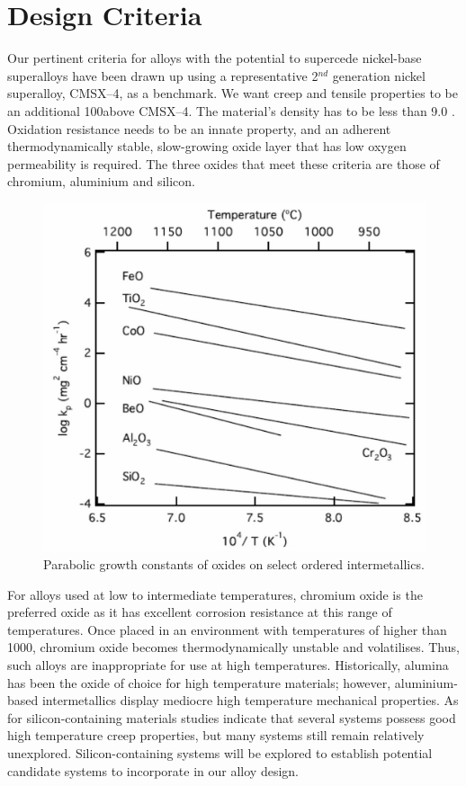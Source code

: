 
\section{Design Criteria}

Our pertinent criteria for alloys with the potential to supercede nickel-base superalloys have been drawn up using a representative 2$^{nd}$ generation nickel superalloy, CMSX--4, as a benchmark. We want creep and tensile properties to be an additional 100\celsius above CMSX--4. The material's density has to be less than 9.0 \gram\usk\centi\rpcubic\metre. Oxidation resistance needs to be an innate property, and an adherent thermodynamically stable, slow-growing oxide layer that has low oxygen permeability is required.  The three oxides that meet these criteria are those of chromium, aluminium and silicon.
%
\begin{figure}[H]
\begin{center}
\includegraphics{IntermetallicOxidation}
\caption{Parabolic growth constants of oxides on select ordered intermetallics.}
\label{fig:IntermetallicOxidation}
\end{center}
\end{figure}
%
For alloys used at low to intermediate temperatures, chromium oxide is the preferred oxide as it has excellent corrosion resistance at this range of temperatures. Once placed in an environment with temperatures of higher than 1000\celsius , chromium oxide becomes thermodynamically unstable and volatilises. Thus, such alloys are inappropriate for use at high temperatures. Historically, alumina has been the oxide of choice for high temperature materials; however, aluminium-based intermetallics display mediocre high temperature mechanical properties. As for silicon-containing materials studies indicate that several systems possess good high temperature creep properties, but many systems still remain relatively unexplored. Silicon-containing systems will be explored to establish potential candidate systems to incorporate in our alloy design. 	

